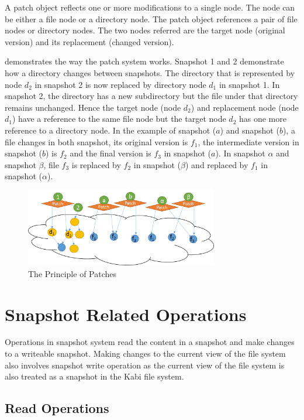     A patch object reflects one or more modifications to a single node. The node can be either a file node or a directory node. The patch object references a pair of file nodes or directory nodes. The two nodes referred are the target node (original version) and its replacement (changed version).

     demonstrates the way the patch system works. Snapshot 1 and 2 demonstrate how a directory changes between snapshots. The directory that is represented by node $d_2$ in snapshot 2 is now replaced by directory node $d_1$ in snapshot 1. In snapshot 2, the directory has a new subdirectory but the file under that directory remains unchanged. Hence the target node (node $d_2$) and replacement node (node $d_1$) have a reference to the same file node but the target node $d_2$ has one more reference to a directory node. In the example of snapshot ($a$) and snapshot ($b$), a file changes in both snapshot, its original version is $f_1$, the intermediate version in snapshot ($b$) is $f_2$ and the final version is $f_3$ in snapshot ($a$). In snapshot $\alpha$ and snapshot $\beta$, file $f_3$ is replaced by $f_2$ in snapshot ($\beta$) and replaced by $f_1$ in snapshot ($\alpha$).  

\begin{figure}[t]
\centering
\includegraphics[width=0.75\textwidth]{Chapter-4/figs/fig14.png}
\caption{The Principle of Patches}
\label{fig:patches}
\end{figure}

\section{Snapshot Related Operations}

    Operations in snapshot system read the content in a snapshot and make changes to a writeable snapshot. Making changes to the current view of the file system also involves snapshot write operation as the current view of the file system is also treated as a snapshot in the Kabi file system.

\subsection{Read Operations}

